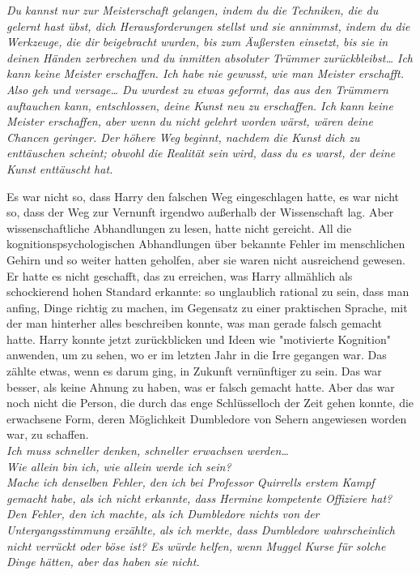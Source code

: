 {\emph{Du kannst nur zur Meisterschaft gelangen, indem du die Techniken, die du gelernt hast übst, dich Herausforderungen stellst und sie annimmst, indem du die Werkzeuge, die dir beigebracht wurden, bis zum Äußersten einsetzt, bis sie in deinen Händen zerbrechen und du inmitten absoluter Trümmer zurückbleibst… Ich kann keine Meister erschaffen. Ich habe nie gewusst, wie man Meister erschafft. Also geh und versage… Du wurdest zu etwas geformt, das aus den Trümmern auftauchen kann, entschlossen, deine Kunst neu zu erschaffen. Ich kann keine Meister erschaffen, aber wenn du nicht gelehrt worden wärst, wären deine Chancen geringer. Der höhere Weg beginnt, nachdem die Kunst dich zu enttäuschen scheint; obwohl die Realität sein wird, dass du es warst, der deine Kunst enttäuscht hat.}

Es war nicht so, dass Harry den falschen Weg eingeschlagen hatte, es war nicht so, dass der Weg zur Vernunft irgendwo außerhalb der Wissenschaft lag. Aber wissenschaftliche Abhandlungen zu lesen, hatte nicht gereicht. All die kognitionspsychologischen Abhandlungen über bekannte Fehler im menschlichen Gehirn und so weiter hatten geholfen, aber sie waren nicht ausreichend gewesen. Er hatte es nicht geschafft, das zu erreichen, was Harry allmählich als schockierend hohen Standard erkannte: so unglaublich rational zu sein, dass man anfing, Dinge richtig zu machen, im Gegensatz zu einer praktischen Sprache, mit der man hinterher alles beschreiben konnte, was man gerade falsch gemacht hatte. Harry konnte jetzt zurückblicken und Ideen wie "motivierte Kognition" anwenden, um zu sehen, wo er im letzten Jahr in die Irre gegangen war. Das zählte etwas, wenn es darum ging, in Zukunft vernünftiger zu sein. Das war besser, als keine Ahnung zu haben, was er falsch gemacht hatte. Aber das war noch nicht die Person, die durch das enge Schlüsselloch der Zeit gehen konnte, die erwachsene Form, deren Möglichkeit Dumbledore von Sehern angewiesen worden war, zu schaffen.\\ \emph{\hfill\break Ich muss schneller denken, schneller erwachsen werden…}\\ \emph{Wie allein bin ich, wie allein werde ich sein?}\\ \emph{Mache ich denselben Fehler, den ich bei Professor Quirrells erstem Kampf gemacht habe, als ich nicht erkannte, dass Hermine kompetente Offiziere hat? Den Fehler, den ich machte, als ich Dumbledore nichts von der Untergangsstimmung erzählte, als ich merkte, dass Dumbledore wahrscheinlich nicht verrückt oder böse ist? Es würde helfen, wenn Muggel Kurse für solche Dinge hätten, aber das haben sie nicht.}

}
